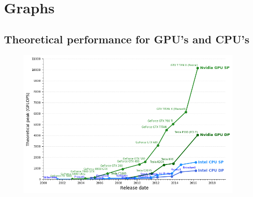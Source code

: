 \section{Graphs}
\subsection{Theoretical performance for GPU's and CPU's \cite{cpu-vs-gpu}}
\label{potential}
\begin{figure}[H]
\centering
\includegraphics[width=\textwidth]{resources/graf.png}
\end{figure}